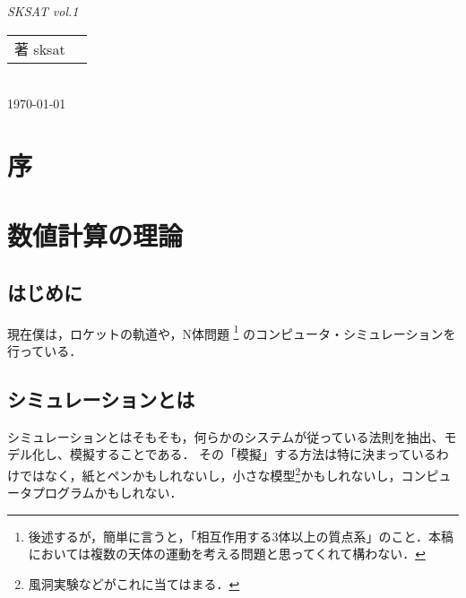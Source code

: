 \documentclass[b5paper]{ujreport}
\begin{document}
\begin{titlepage}
\begin{center}
\vspace*{3pt}
{\large\itshape SKSAT vol.1}
\vspace{12pt} \\
\begin{tabular}{rl}
著 sksat
\end{tabular}
\vspace{3pt} \\
\today \vspace{12pt} \\
\end{center}
\end{titlepage}

\chapter*{序}

\chapter{数値計算の理論}
\section{はじめに}
現在僕は，ロケットの軌道や，N体問題
\footnote{後述するが，簡単に言うと，「相互作用する3体以上の質点系」のこと．本稿においては複数の天体の運動を考える問題と思ってくれて構わない．}
のコンピュータ・シミュレーションを行っている．

\section{シミュレーションとは}
シミュレーションとはそもそも，何らかのシステムが従っている法則を抽出、モデル化し、模擬することである．
その「模擬」する方法は特に決まっているわけではなく，紙とペンかもしれないし，小さな模型\footnote{風洞実験などがこれに当てはまる．}かもしれないし，コンピュータプログラムかもしれない．
\end{document}
